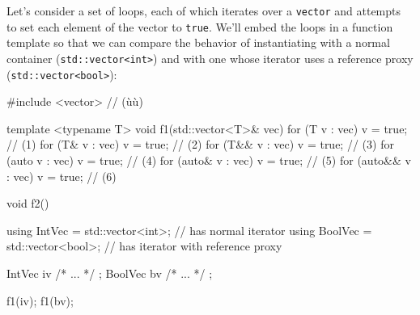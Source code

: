 {{{Let's consider a set of loops, each of which iterates over a
\lstinline!vector! and attempts to set each element of the vector to
\lstinline!true!. We'll embed the loops in a function template so that we
can compare the behavior of instantiating with a normal container
(\lstinline!std::vector<int>!) and with one whose iterator uses a reference
proxy (\lstinline!std::vector<bool>!):

\begin{emcppslisting}[emcppsbatch=e6,emcppserrorlines={7,8,10}]
#include <vector>  // (ù{}ù)

template <typename T>
void f1(std::vector<T>& vec)
{
    for (T      v : vec) { v = true; }  // (1)
    for (T&     v : vec) { v = true; }  // (2)
    for (T&&    v : vec) { v = true; }  // (3)
    for (auto   v : vec) { v = true; }  // (4)
    for (auto&  v : vec) { v = true; }  // (5)
    for (auto&& v : vec) { v = true; }  // (6)
}

void f2()
{
    using IntVec  = std::vector<int>;   // has normal iterator
    using BoolVec = std::vector<bool>;  // has iterator with reference proxy

    IntVec  iv{ /* ... */ };
    BoolVec bv{ /* ... */ };

    f1(iv);
    f1(bv);
}
\end{emcppslisting}
    

}}}
